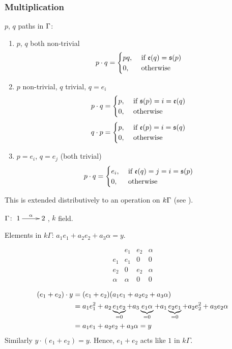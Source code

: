 \subsubsection*{Multiplication} $p$, $q$ paths in $\Gamma$:
\begin{enumerate}[\rm(1)]
\item $p$, $q$ both non-trivial 
\[p\cdot q = \begin{cases} pq, & \text{\ if $\mathfrak{e}(q) =\mathfrak{s}(p)$}\notag\\
0, & \text{\ otherwise}\notag
\end{cases}\]
\item $p$ non-trivial, $q$ trivial, $q = e_i$
\[p\cdot q = \begin{cases} p, & \text{\ if $\mathfrak{s}(p) = i =\mathfrak{e}(q)$}\notag\\
0, & \text{\ otherwise}\notag
\end{cases}\]
\[q\cdot p = \begin{cases} p, & \text{\ if $\mathfrak{e}(p) = i = \mathfrak{s}(q)$}\notag\\
0, & \text{\ otherwise}\notag
\end{cases}\]
\item $p = e_i$, $q = e_j$ (both trivial)
\[p\cdot q = \begin{cases} e_i, & \text{\ if $\mathfrak{e}(q) = j = i
    = \mathfrak{s}(p)$}\notag\\
0, & \text{\ otherwise}\notag
\end{cases}\]
\end{enumerate}
 This is extended distributively to an operation on $k\Gamma$ (see
 \cite[page 50]{ARS}).

\begin{exam}
$\Gamma\colon \xymatrix{1\ar[r]^\alpha & 2}$, $k$ field.  

Elements in $k\Gamma$:  $a_1e_1 + a_2e_2 + a_3\alpha = y$. 

\[\begin{array}{c||c|c|c}
      & e_1 & e_2 & \alpha \\ \hline\hline 
e_1 & e_1 &  0   &    0   \\ \hline
e_2 &   0   & e_2 &  \alpha \\ \hline
\alpha & \alpha & 0 & 0
\end{array}\]
\end{exam}
\begin{align}
(e_1 + e_2)\cdot y & = (e_1 + e_2)(a_1e_1 + a_2e_2 +
                     a_3\alpha)\notag\\
& = a_1e_1^2 + a_2\underbrace{e_1e_2}_{=0} + a_3\underbrace{e_1\alpha}_{=0} + a_1\underbrace{e_2e_1}_{=0} + a_2e_2^2 + a_3
  e_2\alpha\notag\\
& = a_1e_1 + a_2e_2 + a_3\alpha = y\notag
\end{align} 
Similarly $y\cdot (e_1 + e_2) = y$.  Hence,  $e_1 + e_2$ acts like $1$
in $k\Gamma$. 

